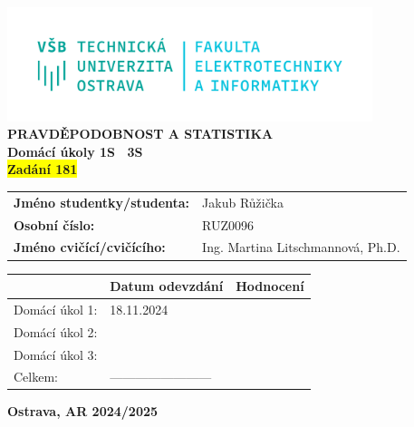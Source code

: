 \documentclass[a4paper,12pt]{report}
\newcommand{\sourceId}   {181}
\newcommand{\studentName}{Jakub Růžička}
\newcommand{\studentID}  {RUZ0096}
\newcommand{\teacherName}{Ing. Martina Litschmannová, Ph.D.	}
\begin{document}
\thispagestyle{empty}
\setcounter{page}{0}

\begin{center}
    \includegraphics[width=0.8\textwidth]{assets/logo.png} \\[4em]
    \vspace{4em}
    \textbf{PRAVDĚPODOBNOST A STATISTIKA} \\
    \vspace{1em}
    \textbf{Domácí úkoly 1S \textendash\ 3S} \\
    \textbf{\colorbox{yellow}{Zadání \sourceId}} \\
\end{center}

\vspace{2em}
\hspace{3em}
\begin{tabular}{ll}
    \textbf{Jméno studentky/studenta:}  & \hspace{6em} \studentName \\[0.5em]
    \textbf{Osobní číslo:}              & \hspace{6em} \studentID   \\[0.5em]
    \textbf{Jméno cvičící/cvičícího:}   & \hspace{6em} \teacherName \\
\end{tabular}

\vspace{10em}
\begin{center}
    \renewcommand{\arraystretch}{1.3}
    \begin{tabular}{|p{8em}|P{10em}|P{10em}|}
        \hline
                        & \textbf{Datum odevzdání}  & \textbf{Hodnocení}    \\ \hline
        Domácí úkol 1:  &      18.11.2024                     &                       \\ \hline
        Domácí úkol 2:  &                           &                       \\ \hline
        Domácí úkol 3:  &                           &                       \\ \hline
        Celkem:         & ------------------------  &                       \\ \hline
    \end{tabular}
\end{center}

\vspace{5em}
\begin{center}
    \textbf{Ostrava, AR 2024/2025}
\end{center}

\newpage


\newpage


%

%

%
\end{document}
